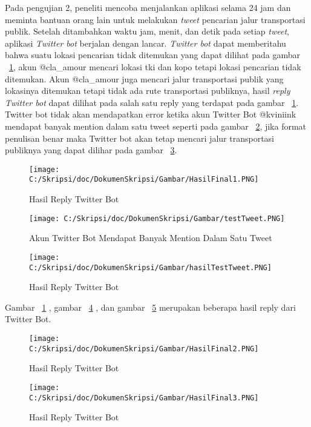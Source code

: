 \begin{enumerate}
	Pada pengujian 2, peneliti mencoba menjalankan aplikasi selama 24 jam dan meminta bantuan orang lain untuk melakukan \textit{tweet} pencarian jalur transportasi publik. Setelah ditambahkan waktu jam, menit, dan detik pada setiap \textit{tweet}, aplikasi \textit{Twitter bot} berjalan dengan lancar. \textit{Twitter bot} dapat memberitahu bahwa suatu lokasi pencarian tidak ditemukan yang dapat dilihat pada gambar ~\ref{fig:HasilFinal1}, akun @cla\_amour mencari lokasi tki dan kopo tetapi lokasi pencarian tidak ditemukan. Akun @cla\_amour juga mencari jalur transportasi publik yang lokasinya ditemukan tetapi tidak ada rute transportasi publiknya, hasil \textit{reply Twitter bot} dapat dilihat pada salah satu reply yang terdapat pada gambar ~\ref{fig:HasilFinal1}. Twitter bot tidak akan mendapatkan error ketika akun Twitter Bot @kviniink mendapat banyak mention dalam satu tweet seperti pada gambar ~\ref{fig:testTweet}, jika format penulisan benar maka Twitter bot akan tetap mencari jalur transportasi publiknya yang dapat dilihar pada gambar ~\ref{fig:hasilTestTweet}.
	
	
	\begin{figure}
		\centering
			\texttt{[image: C:/Skripsi/doc/DokumenSkripsi/Gambar/HasilFinal1.PNG]}
		\caption{Hasil Reply Twitter Bot}
		\label{fig:HasilFinal1}
	\end{figure}
	
	\begin{figure}
		\centering
			\texttt{[image: C:/Skripsi/doc/DokumenSkripsi/Gambar/testTweet.PNG]}
		\caption{Akun Twitter Bot Mendapat Banyak Mention Dalam Satu Tweet}
		\label{fig:testTweet}
	\end{figure}
	
	
	\begin{figure}
		\centering
			\texttt{[image: C:/Skripsi/doc/DokumenSkripsi/Gambar/hasilTestTweet.PNG]}
		\caption{Hasil Reply Twitter Bot}
		\label{fig:hasilTestTweet}
	\end{figure}

	Gambar ~\ref{fig:HasilFinal1} , gambar ~\ref{fig:HasilFinal2} , dan gambar ~\ref{fig:HasilFinal3} merupakan beberapa hasil reply dari Twitter Bot.
	
	
	\begin{figure}
		\centering
			\texttt{[image: C:/Skripsi/doc/DokumenSkripsi/Gambar/HasilFinal2.PNG]}
			\caption{Hasil Reply Twitter Bot}
		\label{fig:HasilFinal2}
	\end{figure}
	
	\begin{figure}
		\centering
			\texttt{[image: C:/Skripsi/doc/DokumenSkripsi/Gambar/HasilFinal3.PNG]}
			\caption{Hasil Reply Twitter Bot}
		\label{fig:HasilFinal3}
	\end{figure}
	
\end{enumerate}
